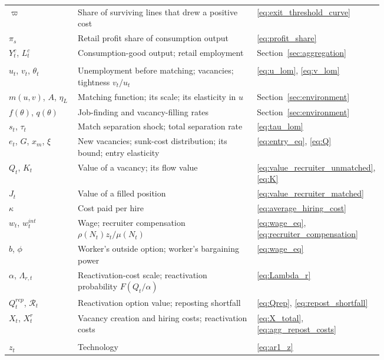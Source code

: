 \documentclass[authoryear, review, 12pt]{elsarticle}
\begin{document}
{\begin{longtable}{@{}>{\raggedright\arraybackslash}p{0.2\linewidth}>{\raggedright\arraybackslash}p{0.54\linewidth}l@{}}
		$\varpi$ & Share of surviving lines that drew a positive cost & \eqref{eq:exit_threshold_curve} \\
		$\pi_s$ & Retail profit share of consumption output & \eqref{eq:profit_share} \\
		$Y_t^c$, $L_t^c$ & Consumption-good output; retail employment & Section~\ref{sec:aggregation} \\
		\addlinespace
		\multicolumn{3}{@{}l}{\emph{Labor market}} \\
		$u_t$, $v_t$, $\theta_t$ & Unemployment before matching; vacancies; tightness $v_t/u_t$ & \eqref{eq:u_lom}, \eqref{eq:v_lom} \\
		$m(u,v)$, $A$, $\eta_L$ & Matching function; its scale; its elasticity in $u$ & Section~\ref{sec:environment} \\
		$f(\theta)$, $q(\theta)$ & Job-finding and vacancy-filling rates & Section~\ref{sec:environment} \\
		$s_t$, $\tau_t$ & Match separation shock; total separation rate & \eqref{eq:tau_lom} \\
		$e_t$, $G$, $x_m$, $\xi$ & New vacancies; sunk-cost distribution; its bound; entry elasticity & \eqref{eq:entry_eq}, \eqref{eq:Q} \\
		$Q_t$, $K_t$ & Value of a vacancy; its flow value & \eqref{eq:value_recruiter_unmatched}, \eqref{eq:K} \\
		$J_t$ & Value of a filled position & \eqref{eq:value_recruiter_matched} \\
		$\kappa$ & Cost paid per hire & \eqref{eq:average_hiring_cost} \\
		$w_t$, $w_t^{int}$ & Wage; recruiter compensation $\rho(N_t)z_t/\mu(N_t)$ & \eqref{eq:wage_eq}, \eqref{eq:recruiter_compensation} \\
		$b$, $\phi$ & Worker's outside option; worker's bargaining power & \eqref{eq:wage_eq} \\
		$\alpha$, $\Lambda_{r,t}$ & Reactivation-cost scale; reactivation probability $F(Q_t/\alpha)$ & \eqref{eq:Lambda_r} \\
		$Q_t^{rep}$, $\mathcal{R}_t$ & Reactivation option value; reposting shortfall & \eqref{eq:Qrep}, \eqref{eq:repost_shortfall} \\
		$X_t$, $X_t^r$ & Vacancy creation and hiring costs; reactivation costs & \eqref{eq:X_total}, \eqref{eq:agg_repost_costs} \\
		\addlinespace
		\multicolumn{3}{@{}l}{\emph{Shocks}} \\
		$z_t$ & Technology & \eqref{eq:ar1_z} \\

\end{longtable}}
\end{document}
